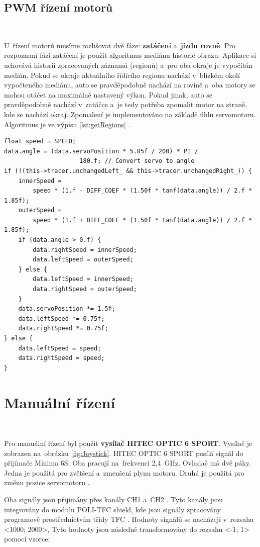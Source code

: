 \subsection{PWM řízení motorů}\

U~řízení motorů musíme rozlišovat dvě fáze: \textbf{zatáčení} a~\textbf{jízdu
rovně}. Pro rozpoznaní fázi zatáčení je použit algoritmus mediánu historie obrazu.
Aplikace si uchovává historii zpracovaných záznamů (regionů) a~pro oba okraje je
vypočítán medián. Pokud se okraje aktuálního řídícího regionu nachází v~blízkém
okolí vypočteného mediánu, auto se pravděpodobně nachází na rovině a~oba motory se
mohou otáčet na maximálně nastavený výkon. Pokud jinak, auto se pravděpodobně
nachází v~zatáčce a~je tedy potřeba zpomalit motor na straně, kde se nachází okraj.
Zpomalení je implementováno na základě úhlu servomotoru. Algoritmus je ve výpisu 
\ref{lst:getRegions} \cite{robot}.

\begin{lstlisting}[caption = Algoritmus kontroly PWM motorů., label = lst:controlPWM]
float speed = SPEED;
data.angle = (data.servoPosition * 5.85f / 200) * PI /
	                 180.f; // Convert servo to angle
if (!(this->tracer.unchangedLeft_ && this->tracer.unchangedRight_)) {
    innerSpeed =
        speed * (1.f - DIFF_COEF * (1.50f * tanf(data.angle)) / 2.f * 1.85f);
    outerSpeed =
        speed * (1.f + DIFF_COEF * (1.50f * tanf(data.angle)) / 2.f * 1.85f);
    if (data.angle > 0.f) {
        data.rightSpeed = innerSpeed;
        data.leftSpeed = outerSpeed;
    } else {
        data.leftSpeed = innerSpeed;
        data.rightSpeed = outerSpeed;
    }
    data.servoPosition *= 1.5f;
    data.leftSpeed *= 0.75f;
    data.rightSpeed *= 0.75f;
} else {
    data.leftSpeed = speed;
    data.rightSpeed = speed;
}
\end{lstlisting}

\section{Manuální řízení}\

Pro manuální řízení byl použit \textbf{vysílač HITEC OPTIC 6 SPORT}.
Vysílač je zobrazen na~obrázku \ref{fig:Joystick}. HITEC OPTIC 6 SPORT 
posílá signál do přijímače Minima 6S. Oba pracují na~frekvenci 2,4~GHz. 
Ovladač má dvě páky. Jedna je použitá pro zvětšení a~zmenšení
plynu motoru. Druhá je použitá pro změnu pozice servomotoru \cite{RC}.

Oba signály jsou přijímány přes kanály CH1 a~CH2 \cite{RC}. Tyto kanály jsou
integrovány do modulu POLI-TFC shield, kde jsou signály zpracovány programově
prostřednictvím třídy TFC \cite{draha}. Hodnoty signálů se nacházejí v~rozsahu
<1000; 2000>, Tyto hodnoty jsou následně transformovány do rozsahu <-1; 1> pomocí 
vzorce:

